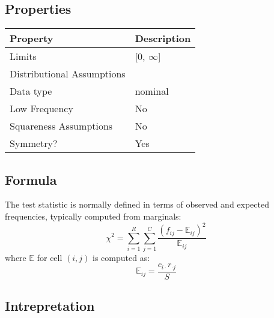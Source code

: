 \documentclass[11pt]{article}
\begin{document}
\subsection{Properties}
\begin{tabular}{| l || l |}
    \hline
    {\bf Property} & {\bf Description} \\
    \hline
    Limits & [0, $\infty$] \\ \hline

    Distributional Assumptions&  \\ \hline

    Data type & nominal \\ \hline

    Low Frequency & No \\ \hline

    Squareness Assumptions & No \\ \hline
    
    Symmetry? & Yes \\ \hline

\end{tabular}


\subsection{Formula}
The test statistic is normally defined in terms of observed and expected frequencies, typically computed from marginals:
$$
\chi^2 = \sum_{i=1}^R{  \sum_{j=1}^C{ \frac{ (f_{ij} - \mathbb{E}_{ij} )^2 }{ \mathbb{E}_{ij} } } }
$$
where $\mathbb{E}$ for cell $(i,j)$ is computed as:
$$
\mathbb{E}_{ij} = \frac{ c_{i \cdot} r_{\cdot j} }{ S }
$$


\subsection{Intrepretation}
\end{document}
